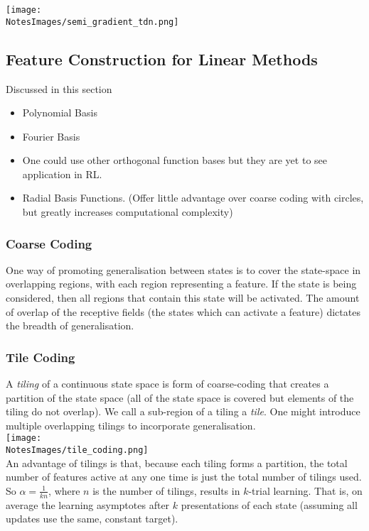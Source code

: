 \texttt{[image: \\NotesImages/semi\_gradient\_tdn.png]}\\


\subsection{Feature Construction for Linear Methods}
Discussed in this section
\begin{itemize}
    \item Polynomial Basis
    \item Fourier Basis
    \item One could use other orthogonal function bases but they are yet to see application in RL.
    \item Radial Basis Functions. (Offer little advantage over coarse coding with circles, but greatly increases computational complexity)
\end{itemize}

\setcounter{subsubsection}{2}
\subsubsection{Coarse Coding}
One way of promoting generalisation between states is to cover the state-space in overlapping regions, with each region representing a feature. If the state is being considered, then all regions that contain this state will be activated. The amount of overlap of the receptive fields (the states which can activate a feature) dictates the breadth of generalisation.


\subsubsection{Tile Coding}
A \emph{tiling} of a continuous state space is form of coarse-coding that creates a partition of the state space (all of the state space is covered but elements of the tiling do not overlap). We call a sub-region of a tiling a \emph{tile}. One might introduce multiple overlapping tilings to incorporate generalisation.\\

\texttt{[image: \\NotesImages/tile\_coding.png]}\\

An advantage of tilings is that, because each tiling forms a partition, the total number of features active at any one time is just the total number of tilings used. So $\alpha = \frac{1}{kn}$, where $n$ is the number of tilings, results in $k$-trial learning. That is, on average the learning asymptotes after $k$ presentations of each state (assuming all updates use the same, constant target).\\

